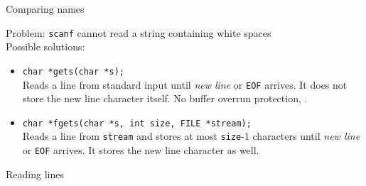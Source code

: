 \documentclass[usenames,dvipsnames,aspectratio=169]{beamer}
\begin{document}
\begin{frame}{Comparing names}
  \begin{exampleblock}{}
    \scriptsize
    
  \end{exampleblock}
  Problem: \texttt{scanf} cannot read a string containing white spaces\\
  Possible solutions:
  \begin{itemize}
    \item \texttt{char *gets(char *s);} \\
      Reads a line from standard input until \emph{new line} or \texttt{EOF} arrives. It does not store the new line character itself. No buffer overrun protection, .
    \item \texttt{char *fgets(char *s, int size, FILE *stream);} \\
      Reads a line from \texttt{stream} and stores at most \texttt{size}-1 characters until \emph{new line} or \texttt{EOF} 
arrives. It stores the new line character as well.
  \end{itemize}
\end{frame}

\begin{frame}{Reading lines}
  \begin{exampleblock}{}
    \footnotesize
    
  \end{exampleblock}
  \begin{exampleblock}{}
    \footnotesize
    
  \end{exampleblock}
\end{frame}
\end{document}
